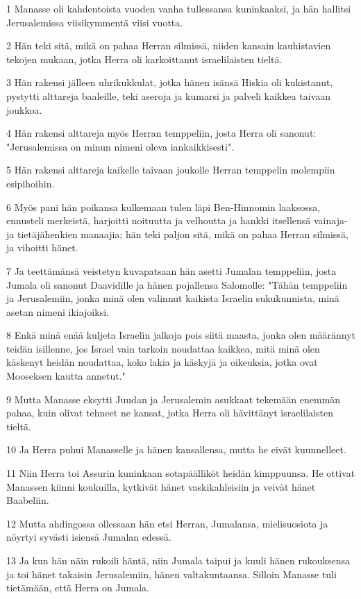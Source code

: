 \par 1 Manasse oli kahdentoista vuoden vanha tullessansa kuninkaaksi, ja hän hallitsi Jerusalemissa viisikymmentä viisi vuotta.
\par 2 Hän teki sitä, mikä on pahaa Herran silmissä, niiden kansain kauhistavien tekojen mukaan, jotka Herra oli karkoittanut israelilaisten tieltä.
\par 3 Hän rakensi jälleen uhrikukkulat, jotka hänen isänsä Hiskia oli kukistanut, pystytti alttareja baaleille, teki aseroja ja kumarsi ja palveli kaikkea taivaan joukkoa.
\par 4 Hän rakensi alttareja myös Herran temppeliin, josta Herra oli sanonut: "Jerusalemissa on minun nimeni oleva iankaikkisesti".
\par 5 Hän rakensi alttareja kaikelle taivaan joukolle Herran temppelin molempiin esipihoihin.
\par 6 Myös pani hän poikansa kulkemaan tulen läpi Ben-Hinnomin laaksossa, ennusteli merkeistä, harjoitti noituutta ja velhoutta ja hankki itsellensä vainaja- ja tietäjähenkien manaajia; hän teki paljon sitä, mikä on pahaa Herran silmissä, ja vihoitti hänet.
\par 7 Ja teettämänsä veistetyn kuvapatsaan hän asetti Jumalan temppeliin, josta Jumala oli sanonut Daavidille ja hänen pojallensa Salomolle: "Tähän temppeliin ja Jerusalemiin, jonka minä olen valinnut kaikista Israelin sukukunnista, minä asetan nimeni ikiajoiksi.
\par 8 Enkä minä enää kuljeta Israelin jalkoja pois siitä maasta, jonka olen määrännyt teidän isillenne, jos Israel vain tarkoin noudattaa kaikkea, mitä minä olen käskenyt heidän noudattaa, koko lakia ja käskyjä ja oikeuksia, jotka ovat Mooseksen kautta annetut."
\par 9 Mutta Manasse eksytti Juudan ja Jerusalemin asukkaat tekemään enemmän pahaa, kuin olivat tehneet ne kansat, jotka Herra oli hävittänyt israelilaisten tieltä.
\par 10 Ja Herra puhui Manasselle ja hänen kansallensa, mutta he eivät kuunnelleet.
\par 11 Niin Herra toi Assurin kuninkaan sotapäälliköt heidän kimppuunsa. He ottivat Manassen kiinni koukuilla, kytkivät hänet vaskikahleisiin ja veivät hänet Baabeliin.
\par 12 Mutta ahdingossa ollessaan hän etsi Herran, Jumalansa, mielisuosiota ja nöyrtyi syvästi isiensä Jumalan edessä.
\par 13 Ja kun hän näin rukoili häntä, niin Jumala taipui ja kuuli hänen rukouksensa ja toi hänet takaisin Jerusalemiin, hänen valtakuntaansa. Silloin Manasse tuli tietämään, että Herra on Jumala.
